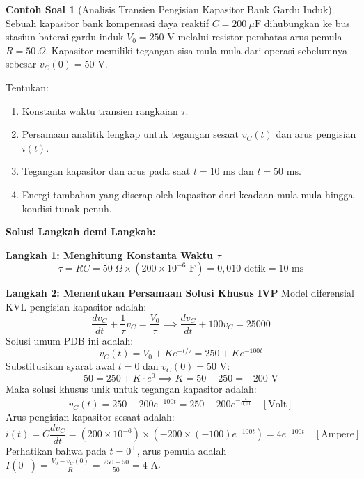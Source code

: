 \documentclass[11pt,a4paper]{article}
\theoremstyle{definition}
\newtheorem{example}{Contoh Soal}[section]
\begin{document}
\begin{example}[Analisis Transien Pengisian Kapasitor Bank Gardu Induk]
Sebuah kapasitor bank kompensasi daya reaktif $C = 200\ \mu\text{F}$ dihubungkan ke bus stasiun baterai gardu induk $V_0 = 250\text{ V}$ melalui resistor pembatas arus pemula $R = 50\ \Omega$. Kapasitor memiliki tegangan sisa mula-mula dari operasi sebelumnya sebesar $v_C(0) = 50\text{ V}$.

Tentukan:
\begin{enumerate}
    \item Konstanta waktu transien rangkaian $\tau$.
    \item Persamaan analitik lengkap untuk tegangan sesaat $v_C(t)$ dan arus pengisian $i(t)$.
    \item Tegangan kapasitor dan arus pada saat $t = 10\text{ ms}$ dan $t = 50\text{ ms}$.
    \item Energi tambahan yang diserap oleh kapasitor dari keadaan mula-mula hingga kondisi tunak penuh.
\end{enumerate}

\textbf{Solusi Langkah demi Langkah:}

\textbf{Langkah 1: Menghitung Konstanta Waktu $\tau$}
\begin{equation}
    \tau = R C = 50\ \Omega \times (200 \times 10^{-6}\text{ F}) = 0{,}010\text{ detik} = 10\text{ ms}
\end{equation}

\textbf{Langkah 2: Menentukan Persamaan Solusi Khusus IVP}
Model diferensial KVL pengisian kapasitor adalah:
\begin{equation}
    \frac{dv_C}{dt} + \frac{1}{\tau} v_C = \frac{V_0}{\tau} \implies \frac{dv_C}{dt} + 100 v_C = 25000
\end{equation}
Solusi umum PDB ini adalah:
\begin{equation}
    v_C(t) = V_0 + K e^{-t/\tau} = 250 + K e^{-100t}
\end{equation}
Substitusikan syarat awal $t = 0$ dan $v_C(0) = 50\text{ V}$:
\begin{equation}
    50 = 250 + K \cdot e^0 \implies K = 50 - 250 = -200\text{ V}
\end{equation}
Maka solusi khusus unik untuk tegangan kapasitor adalah:
\begin{equation}
    v_C(t) = 250 - 200 e^{-100t} = 250 - 200 e^{-\frac{t}{0{,}01}}\quad [\text{Volt}]
\end{equation}
Arus pengisian kapasitor sesaat adalah:
\begin{equation}
    i(t) = C \frac{dv_C}{dt} = (200 \times 10^{-6}) \times \left( -200 \times (-100) e^{-100t} \right) = 4 e^{-100t}\quad [\text{Ampere}]
\end{equation}
Perhatikan bahwa pada $t = 0^+$, arus pemula adalah $I(0^+) = \frac{V_0 - v_C(0)}{R} = \frac{250 - 50}{50} = 4\text{ A}$.


\end{example}
\end{document}

